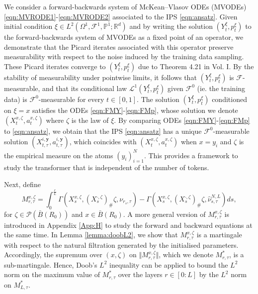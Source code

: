 \documentclass{article}
\newcommand{\R}{\mathbb{R}}
\begin{document}
We consider a forward-backwards system of McKean--Vlasov ODEs (MVODEs) \eqref{eqn:MVRODE1}-\eqref{eqn:MVRODE2} associated to the IPS \eqref{eqn:ansatz}. Given initial condition $\xi \in L^2(\Omega^1,\mathcal F^1,\mathbb P^1;\R^d)$ and by writing the solution $(Y^{\xi}_t,p^\xi_t)$ to the forward-backwards system of MVODEs as a fixed point of an operator, we demonstrate that the Picard iterates associated with this operator preserve measurability with respect to the noise induced by the training data sampling. These Picard iterates converge to $(Y^{\xi}_t,p^\xi_t)$ due to Theorem 4.21 in \cite{carmona2018probabilistic} Vol. I. By the stability of measurability under pointwise limits, it follows that $(Y^{\xi}_t,p^\xi_t)$ is $\mathcal F$-measurable, and that its conditional law $\mathcal L^1(Y^{\xi}_t,p^\xi_t)$ given  $\mathcal F^0$ (ie. the training data) is $\mathcal F^0$-measurable for every $t\in[0,1]$. The solution $(Y^{\xi}_t,p^\xi_t)$ conditioned on $\xi=x$ satisfies the ODEs \eqref{eqn:FMY}-\eqref{eqn:FMp}, whose solution we denote $(X^{x,\zeta}_t,a^{x,\zeta}_t)$ where $\zeta$ is the law of $\xi$. By comparing ODEs \eqref{eqn:FMY}-\eqref{eqn:FMp} to  \eqref{eqn:ansatz}, we obtain that the IPS \eqref{eqn:ansatz} has a unique $\mathcal F^0$-measurable solution $(X^{i,\bm{y}}_{t,\tau},a^{i,\bm{y}}_{t,\tau})$, which coincides with $(X^{x,\zeta}_t,a^{x,\zeta}_t)$ when $x=y_i$ and $\zeta$ is the empirical measure on the atoms $(y_i)_{i=1}^N$. This provides a framework to study the transformer that is independent of the number of tokens.

Next, define
    \[
    M^{x,\zeta}_{r,\tau}= \int_0^{\frac{r}{L}}\Gamma\left(X^{x,\zeta}_s, (X^{\cdot,\zeta}_s)_\#\zeta, \nu_{r_s,\tau}\right)- \Gamma(X^{x,\zeta}_s,(X^{\cdot,\zeta}_s)_\#\zeta,\hat\nu^{N,L}_{s,\tau}) ds,
    \]
for $\zeta\in \mathcal P(\bar B(R_0))$ and $x\in\bar B(R_0)$. A more general version of $M^{x,\zeta}_{r,\tau}$ is introduced in Appendix \ref{App:H} to study the forward and backward equations at the same time. In Lemma \ref{lemma:doobL2}, we show that $M^{x,\zeta}_{r,\tau}$ is a martingale with respect to the natural filtration generated by the initialised parameters. Accordingly, the supremum over $(x,\zeta)$ on $\Vert M^{x,\zeta}_{r,\tau}\Vert$, which we denote $M^*_{r,\tau}$, is a sub-martingale. Hence,  Doob's $L^2$ inequality \cite{revuz2013continuous} can be applied to bound the $L^2$ norm on the maximum value of $M^*_{r,\tau}$ over the layers $r\in[0:L]$ by the $L^2$ norm on $M^*_{L,\tau}$. 
\end{document}

